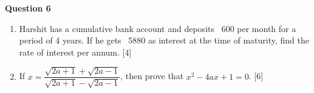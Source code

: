 \noindent
\textbf{Question 6}
\begin{enumerate}[label=(\roman*)]

    \item Harshit has a cumulative bank account and deposits \rupee~600 
        per month for a period of 4 years. If he gets \rupee~5880 as 
        interest at the time of maturity, find the rate of interest 
        per annum. \hfill [4]

    \item If $x = \dfrac{\sqrt{2a+1} + \sqrt{2a-1}}{\sqrt{2a+1} - \sqrt{2a-1}}$, 
        then prove that $x^2 - 4ax + 1 = 0$. \hfill [6]

\end{enumerate}


